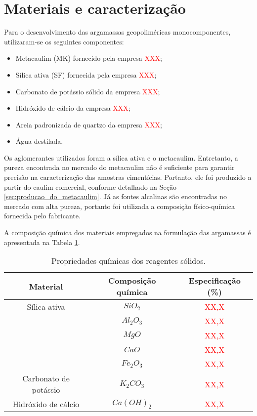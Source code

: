 \section{Materiais e caracterização}
\label{sec:materiais_e_caracterizacao}

Para o desenvolvimento das argamassas geopoliméricas monocomponentes, utilizaram-se os seguintes componentes:

\begin{itemize}
    \item Metacaulim (MK) fornecido pela empresa \textcolor{red}{XXX};
    \item Sílica ativa (SF) fornecida pela empresa \textcolor{red}{XXX};
    \item Carbonato de potássio sólido da empresa \textcolor{red}{XXX};
    \item Hidróxido de cálcio da empresa \textcolor{red}{XXX};
    \item Areia padronizada de quartzo da empresa \textcolor{red}{XXX};
    \item Água destilada.
\end{itemize}

Os aglomerantes utilizados foram a sílica ativa e o metacaulim. Entretanto, a pureza encontrada no mercado do metacaulim não é suficiente para garantir precisão na caracterização das amostras cimentícias.
Portanto, ele foi produzido a partir do caulim comercial, conforme detalhado na Seção \ref{sec:producao_do_metacaulim}.
Já as fontes alcalinas são encontradas no mercado com alta pureza, portanto foi utilizada a composição físico-química fornecida pelo fabricante.

A composição química dos materiais empregados na formulação das argamassas é apresentada na Tabela \ref{tab:composicao_quimica_reagentes}.

\begin{table}[H]
    \caption{Propriedades químicas dos reagentes sólidos.}
    \label{tab:composicao_quimica_reagentes}
    \center
    \begin{tabular}{ccc}
        \hline
        Material & Composição química & Especificação (\%)\\
        \hline
        Sílica ativa & $SiO_2$ &  \textcolor{red}{XX,X} \\
            & $ Al_2O_3$ & \textcolor{red}{XX,X} \\
            & $MgO$ & \textcolor{red}{XX,X} \\
            & $CaO$ & \textcolor{red}{XX,X} \\
            & $Fe_2O_3$ & \textcolor{red}{XX,X} \\
        Carbonato de potássio & $K_2CO_3$ & \textcolor{red}{XX,X} \\
        Hidróxido de cálcio & $Ca(OH)_2$ & \textcolor{red}{XX,X} \\
        \hline
    \end{tabular}
\end{table}

